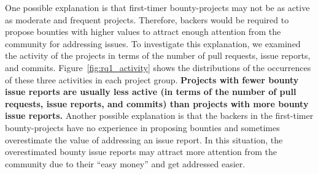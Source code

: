 One possible explanation is that first-timer bounty-projects may not be as active as moderate and frequent projects. Therefore, backers would be required to propose bounties with higher values to attract enough attention from the community for addressing issues. To investigate this explanation, we examined the activity of the projects in terms of the number of pull requests, issue reports, and commits. Figure~\ref{fig:rq1_activity} shows the distributions of the occurrences of these three activities in each project group.
\textbf{Projects with fewer bounty issue reports are usually less active (in terms of the number of pull requests, issue reports, and commits) than projects with more bounty issue reports.} Another possible explanation is that the backers in the first-timer bounty-projects have no experience in proposing bounties and sometimes overestimate the value of addressing an issue report. In this situation, the overestimated bounty issue reports may attract more attention from the community due to their ``easy money'' and get addressed easier.




